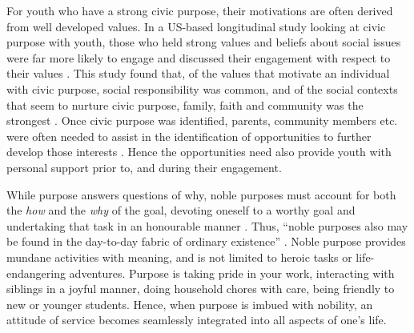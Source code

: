 For youth who have a strong civic purpose, their motivations are often derived from well developed values. In a US-based longitudinal study looking at civic purpose with youth, those who held strong values and beliefs about social issues were far more likely to engage and discussed their engagement with respect to their values \citep{Malin2015}. This study found that, of the values that motivate an individual with civic purpose, social responsibility was common, and of the social contexts that seem to nurture civic purpose, family, faith and community was the strongest \citep{Malin2015}. Once civic purpose was identified, parents, community members etc. were often needed to assist in the identification of opportunities to further develop those interests \citep{Malin2015}. Hence the opportunities need also provide youth with personal support prior to, and during their engagement. 


While purpose answers questions of why, noble purposes must account for both the \textit{how} and the \textit{why} of the goal, devoting oneself to a worthy goal and undertaking that task in an honourable manner \citep{Damon2003}. Thus, “noble purposes also may be found in the day-to-day fabric of ordinary existence” \citep[][p44]{Damon2003}. Noble purpose provides mundane activities with meaning, and is not limited to heroic tasks or life-endangering adventures. Purpose is taking pride in your work, interacting with siblings in a joyful manner, doing household chores with care, being friendly to new or younger students. Hence, when purpose is imbued with nobility, an attitude of service becomes seamlessly integrated into all aspects of one's life. 











